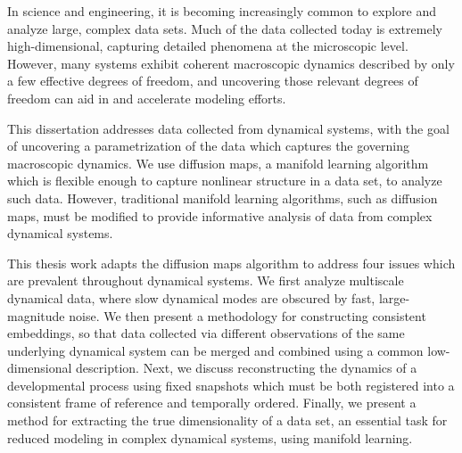 

In science and engineering, it is becoming increasingly common to explore and analyze large, complex data sets.
%
Much of the data collected today is extremely high-dimensional, capturing detailed phenomena at the microscopic level.
%
However, many systems exhibit coherent macroscopic dynamics described by only a few effective degrees of freedom, and uncovering those relevant degrees of freedom can aid in and accelerate modeling efforts.

This dissertation addresses data collected from dynamical systems, with the goal of uncovering a parametrization of the data which captures the governing macroscopic dynamics.
%
We use diffusion maps, a manifold learning algorithm which is flexible enough to capture nonlinear structure in a data set, to analyze such data.
%
However, traditional manifold learning algorithms, such as diffusion maps, must be modified to provide informative analysis of data from complex dynamical systems.

This thesis work adapts the diffusion maps algorithm to address four issues which are prevalent throughout dynamical systems.
%
We first analyze multiscale dynamical data, where slow dynamical modes are obscured by fast, large-magnitude noise.
%
We then present a methodology for constructing consistent embeddings, so that data collected via different observations of the same underlying dynamical system can be merged and combined using a common low-dimensional description.
%
Next, we discuss reconstructing the dynamics of a developmental process using fixed snapshots which must be both registered into a consistent frame of reference and temporally ordered.
%
Finally, we present a method for extracting the true dimensionality of a data set, an essential task for reduced modeling in complex dynamical systems, using manifold learning. 